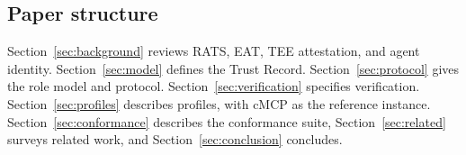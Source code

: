 \subsection*{Paper structure}

Section~\ref{sec:background} reviews RATS, EAT, TEE attestation, and agent identity.
Section~\ref{sec:model} defines the Trust Record. Section~\ref{sec:protocol} gives
the role model and protocol. Section~\ref{sec:verification} specifies verification.
Section~\ref{sec:profiles} describes profiles, with cMCP as the reference instance.
Section~\ref{sec:conformance} describes the conformance suite,
Section~\ref{sec:related} surveys related work, and Section~\ref{sec:conclusion}
concludes.
